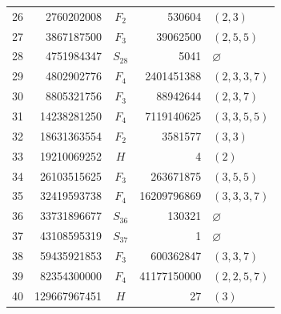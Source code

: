 \documentclass[11pt]{article}
\theoremstyle{definition}
\begin{document}
\begin{longtable}{rrcrl}
26 & 2760202008 & $F_2$ & 530604 & $(2,3)$\\
27 & 3867187500 & $F_3$ & 39062500 & $(2,5,5)$\\
28 & 4751984347 & $S_{28}$ & 5041 & $\varnothing$\\
29 & 4802902776 & $F_4$ & 2401451388 & $(2,3,3,7)$\\
30 & 8805321756 & $F_3$ & 88942644 & $(2,3,7)$\\
31 & 14238281250 & $F_4$ & 7119140625 & $(3,3,5,5)$\\
32 & 18631363554 & $F_2$ & 3581577 & $(3,3)$\\
33 & 19210069252 & $H$ & 4 & $(2)$\\
34 & 26103515625 & $F_3$ & 263671875 & $(3,5,5)$\\
35 & 32419593738 & $F_4$ & 16209796869 & $(3,3,3,7)$\\
36 & 33731896677 & $S_{36}$ & 130321 & $\varnothing$\\
37 & 43108595319 & $S_{37}$ & 1 & $\varnothing$\\
38 & 59435921853 & $F_3$ & 600362847 & $(3,3,7)$\\
39 & 82354300000 & $F_4$ & 41177150000 & $(2,2,5,7)$\\
40 & 129667967451 & $H$ & 27 & $(3)$\\
\end{longtable}
\endgroup
\end{document}
